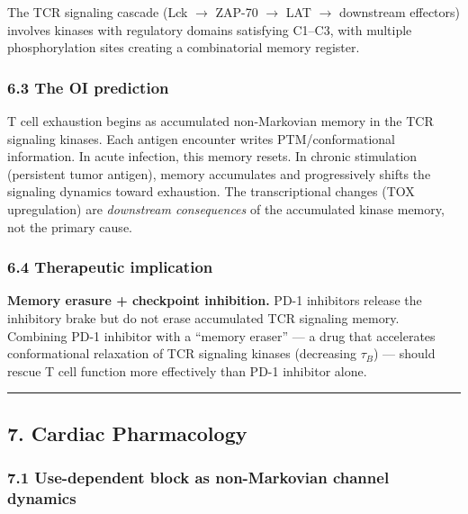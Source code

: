 \documentclass[
  11pt,
]{article}
\begin{document}
The TCR signaling cascade (Lck \(\to\) ZAP-70 \(\to\) LAT \(\to\)
downstream effectors) involves kinases with regulatory domains
satisfying C1--C3, with multiple phosphorylation sites creating a
combinatorial memory register.

\hypertarget{the-oi-prediction-2}{%
\subsubsection{6.3 The OI prediction}\label{the-oi-prediction-2}}

T cell exhaustion begins as accumulated non-Markovian memory in the TCR
signaling kinases. Each antigen encounter writes PTM/conformational
information. In acute infection, this memory resets. In chronic
stimulation (persistent tumor antigen), memory accumulates and
progressively shifts the signaling dynamics toward exhaustion. The
transcriptional changes (TOX upregulation) are \emph{downstream
consequences} of the accumulated kinase memory, not the primary cause.

\hypertarget{therapeutic-implication-1}{%
\subsubsection{6.4 Therapeutic
implication}\label{therapeutic-implication-1}}

\textbf{Memory erasure + checkpoint inhibition.} PD-1 inhibitors release
the inhibitory brake but do not erase accumulated TCR signaling memory.
Combining PD-1 inhibitor with a ``memory eraser'' --- a drug that
accelerates conformational relaxation of TCR signaling kinases
(decreasing \(\tau_B\)) --- should rescue T cell function more
effectively than PD-1 inhibitor alone.

\begin{center}\rule{0.5\linewidth}{0.5pt}\end{center}

\hypertarget{cardiac-pharmacology}{%
\subsection{7. Cardiac Pharmacology}\label{cardiac-pharmacology}}

\hypertarget{use-dependent-block-as-non-markovian-channel-dynamics}{%
\subsubsection{7.1 Use-dependent block as non-Markovian channel
dynamics}\label{use-dependent-block-as-non-markovian-channel-dynamics}}
\end{document}
